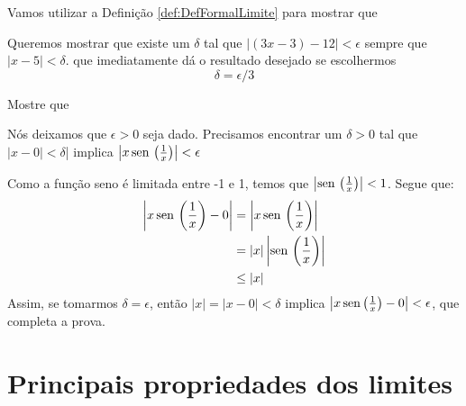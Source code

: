 \cleardoublepage\documentclass[../main.tex]{subfiles}
\begin{document}
\vspace{0.1cm}
\begin{ex}
  Vamos utilizar a Definição \ref{def:DefFormalLimite} para mostrar que 
\begin{solution}
  Queremos mostrar que existe um $\delta$ tal que $|(3x-3)-12|<\epsilon$ sempre que $|x-5|<\delta$.
  que imediatamente dá o resultado desejado se escolhermos
  $$\delta=\epsilon/3$$
\end{solution} 
\end{ex}
\begin{ex}
  Mostre que 
  \begin{solution}
      Nós deixamos que $\epsilon >0$ seja dado. Precisamos encontrar um $ \delta >0$ tal que $|x-0|<\delta$| implica $\left|x\operatorname{sen}\,\left(\frac{1}{x}\right)\right|<\epsilon$

Como a função  seno é limitada entre -1 e 1, temos que $\left|\operatorname{sen}\,\left(\frac{1}{x}\right)\right|<1$. Segue que:
\begin{align*}
    \left|x\operatorname{sen}\,\left(\frac{1}{x}\right)-0\right|&=\left|x\operatorname{sen}\,\left(\frac{1}{x}\right)\right|\\
    &=|x|\left|\operatorname{sen}\,\left(\frac{1}{x}\right)\right|\\
    &\leq |x|
\end{align*}
Assim, se tomarmos $\delta=\epsilon$, então $|x|=|x-0|<\delta $ implica $\left|x\operatorname {sen} \left(\frac {1}{x}\right)-0\right|<\epsilon$,  que completa a prova.
  \end{solution}
  
\end{ex}

\section{Principais propriedades dos limites}\hypertarget{PropLimite}{}\label{sec:PropLimite}
\end{document}
